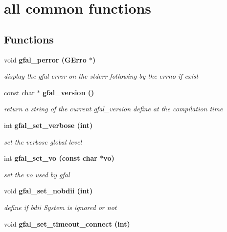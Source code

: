 \section{all common functions}
\label{group__common__group}
\subsection*{Functions}
\begin{CompactItemize}
\item 
void \bf{gfal\_\-perror} (GErro $\ast$)
\begin{CompactList}\small\item\em display the gfal error on the stderr following by the errno if exist \item\end{CompactList}\item 
const char $\ast$ \bf{gfal\_\-version} ()\label{group__common__group_ga5a8df616e6a5e6fc1d94e2374c7ccf2}

\begin{CompactList}\small\item\em return a string of the current gfal\_\-version define at the compilation time \item\end{CompactList}\item 
int \bf{gfal\_\-set\_\-verbose} (int)
\begin{CompactList}\small\item\em set the verbose global level \item\end{CompactList}\item 
int \bf{gfal\_\-set\_\-vo} (const char $\ast$vo)\label{group__common__group_gcf4ae9045b7e5a2a697b1bb1f05994a8}

\begin{CompactList}\small\item\em set the vo used by gfal \item\end{CompactList}\item 
void \bf{gfal\_\-set\_\-nobdii} (int)
\begin{CompactList}\small\item\em define if bdii System is ignored or not \item\end{CompactList}\item 
void \bf{gfal\_\-set\_\-timeout\_\-connect} (int)\label{group__common__group_g62f544258aa58af5122f40f0eb1a7c92}


\end{CompactItemize}
